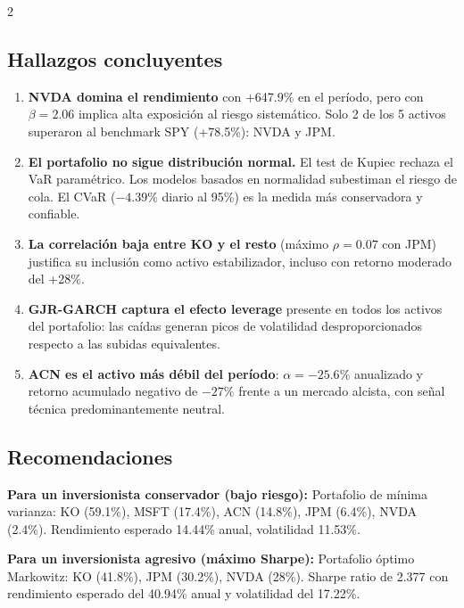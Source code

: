 \documentclass[10pt,a4paper]{article}
\begin{document}
\begin{multicols}{2}

\subsection{Hallazgos concluyentes}

\begin{enumerate}
  \item \textbf{NVDA domina el rendimiento} con +647.9\% en el período, pero con $\beta=2.06$ implica alta exposición al riesgo sistemático. Solo 2 de los 5 activos superaron al benchmark SPY (+78.5\%): NVDA y JPM.

  \item \textbf{El portafolio no sigue distribución normal.} El test de Kupiec rechaza el VaR paramétrico. Los modelos basados en normalidad subestiman el riesgo de cola. El CVaR ($-4.39\%$ diario al 95\%) es la medida más conservadora y confiable.

  \item \textbf{La correlación baja entre KO y el resto} (máximo $\rho=0.07$ con JPM) justifica su inclusión como activo estabilizador, incluso con retorno moderado del +28\%.

  \item \textbf{GJR-GARCH captura el efecto leverage} presente en todos los activos del portafolio: las caídas generan picos de volatilidad desproporcionados respecto a las subidas equivalentes.

  \item \textbf{ACN es el activo más débil del período}: $\alpha=-25.6\%$ anualizado y retorno acumulado negativo de $-27\%$ frente a un mercado alcista, con señal técnica predominantemente neutral.
\end{enumerate}

\columnbreak

\subsection{Recomendaciones}

\begin{insightbox}
\footnotesize\textbf{Para un inversionista conservador (bajo riesgo):}
Portafolio de mínima varianza: KO (59.1\%), MSFT (17.4\%), ACN (14.8\%), JPM (6.4\%), NVDA (2.4\%). Rendimiento esperado 14.44\% anual, volatilidad 11.53\%.
\end{insightbox}

\begin{insightbox}
\footnotesize\textbf{Para un inversionista agresivo (máximo Sharpe):}
Portafolio óptimo Markowitz: KO (41.8\%), JPM (30.2\%), NVDA (28\%). Sharpe ratio de 2.377 con rendimiento esperado del 40.94\% anual y volatilidad del 17.22\%.
\end{insightbox}


\end{multicols}
\end{document}
